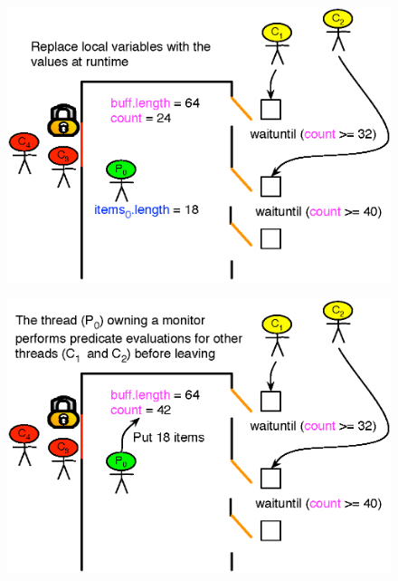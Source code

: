 \documentclass[mathserif,14pt,xcolor=table]{beamer}
\begin{document}
\begin{frame}
{\begin{figure}[ht!]
            \includegraphics[scale=0.75]{fig/eval_exp_3.eps}
        \end{figure}
    }
     {
        \begin{figure}[ht!]
            \centering
            \includegraphics[scale=0.75]{fig/eval_exp_4.eps}
        \end{figure}
    }
\end{frame}


\end{document}
